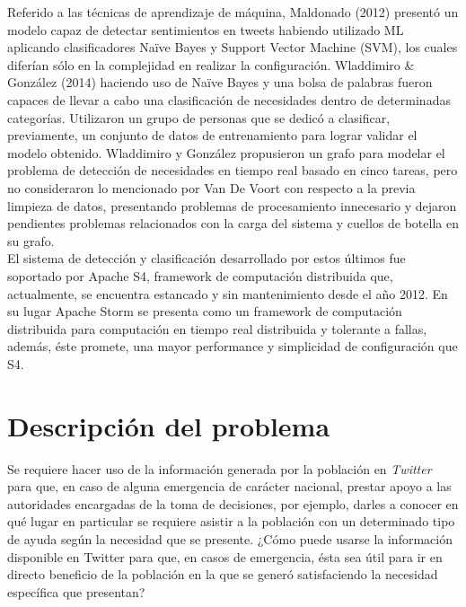 Referido a las técnicas de aprendizaje de máquina, Maldonado (2012) presentó un modelo capaz de detectar sentimientos en tweets habiendo utilizado ML aplicando clasificadores Naïve Bayes y Support Vector Machine (SVM), los cuales diferían sólo en la complejidad en realizar la configuración. Wladdimiro \& González (2014) haciendo uso de Naïve Bayes y una bolsa de palabras fueron capaces de llevar a cabo una clasificación de necesidades dentro de determinadas categorías. Utilizaron un grupo de personas que se dedicó a clasificar, previamente, un conjunto de datos de entrenamiento para lograr validar el modelo obtenido. Wladdimiro y González propusieron un grafo para modelar el problema de detección de necesidades en tiempo real basado en cinco tareas, pero no consideraron lo mencionado por Van De Voort con respecto a la previa limpieza de datos, presentando problemas de procesamiento innecesario y dejaron pendientes problemas relacionados con la carga del sistema y cuellos de botella en su grafo.\\
El sistema de detección y clasificación desarrollado por estos últimos fue soportado por Apache S4, framework de computación distribuida que, actualmente, se encuentra estancado y sin mantenimiento desde el año 2012. En su lugar Apache Storm se presenta como un framework de computación distribuida para computación en tiempo real distribuida y tolerante a fallas, además, éste promete, una mayor performance y simplicidad de configuración que S4. 


\section{Descripci\'on del problema}
\label{intro:problema}
Se requiere hacer uso de la información generada por la población en \textit{Twitter} para que, en caso de alguna emergencia de carácter nacional, prestar apoyo a las autoridades encargadas de la toma de decisiones, por ejemplo, darles a conocer en qué lugar en particular se requiere asistir a la población con un determinado tipo de ayuda según la necesidad que se presente. ¿Cómo puede usarse la información disponible en Twitter para que, en casos de emergencia, ésta sea útil para ir en directo beneficio de la población en la que se generó satisfaciendo la necesidad específica que presentan?

